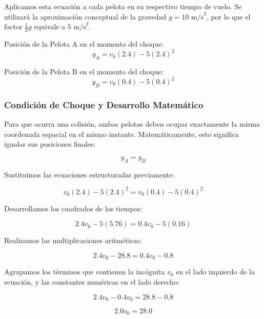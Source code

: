 \documentclass[12pt, a4paper]{article}
\begin{document}
Aplicamos esta ecuación a cada pelota en su respectivo tiempo de vuelo. Se utilizará la aproximación conceptual de la gravedad $g = 10 \text{ m/s}^2$, por lo que el factor $\frac{1}{2}g$ equivale a $5 \text{ m/s}^2$.

Posición de la Pelota A en el momento del choque:
\begin{equation}
y_A = v_0 (2.4) - 5 (2.4)^2
\end{equation}

Posición de la Pelota B en el momento del choque:
\begin{equation}
y_B = v_0 (0.4) - 5 (0.4)^2
\end{equation}

\subsubsection*{Condición de Choque y Desarrollo Matemático}

Para que ocurra una colisión, ambas pelotas deben ocupar exactamente la misma coordenada espacial en el mismo instante. Matemáticamente, esto significa igualar sus posiciones finales:

\begin{equation}
y_A = y_B
\end{equation}

Sustituimos las ecuaciones estructuradas previamente:

\begin{equation}
v_0 (2.4) - 5 (2.4)^2 = v_0 (0.4) - 5 (0.4)^2
\end{equation}

Desarrollamos los cuadrados de los tiempos:

\begin{equation}
2.4 v_0 - 5 (5.76) = 0.4 v_0 - 5 (0.16)
\end{equation}

Realizamos las multiplicaciones aritméticas:

\begin{equation}
2.4 v_0 - 28.8 = 0.4 v_0 - 0.8
\end{equation}

Agrupamos los términos que contienen la incógnita $v_0$ en el lado izquierdo de la ecuación, y las constantes numéricas en el lado derecho:

\begin{equation}
2.4 v_0 - 0.4 v_0 = 28.8 - 0.8
\end{equation}

\begin{equation}
2.0 v_0 = 28.0
\end{equation}
\end{document}
